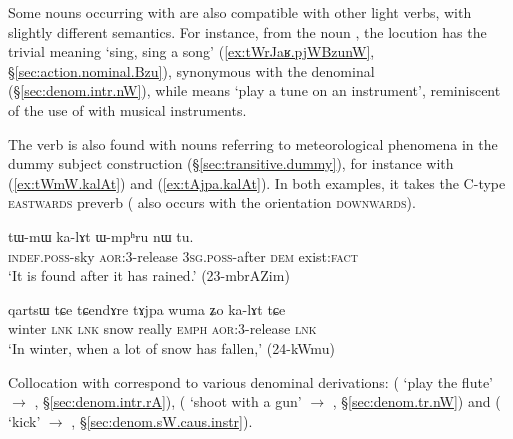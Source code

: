 Some nouns occurring with  are also compatible with other light verbs, with slightly different semantics. For instance, from the noun , the locution  has the trivial meaning `sing, sing a song' (\ref{ex:tWrJaʁ.pjWBzunW}, §\ref{sec:action.nominal.Bzu}), synonymous with the denominal   (§\ref{sec:denom.intr.nW}), while  means `play a tune on an instrument', reminiscent of the use of   with musical instruments.
  
 
 The verb   is also found with nouns referring to meteorological phenomena in the dummy subject construction (§\ref{sec:transitive.dummy}), for instance with   (\ref{ex:tWmW.kalAt})  and   (\ref{ex:tAjpa.kalAt}). In both examples, it takes the C-type  \textsc{eastwards} preverb   ( also occurs with the orientation \textsc{downwards}).

\begin{exe}
\ex \label{ex:tWmW.kalAt}
\gll  tɯ-mɯ ka-lɤt ɯ-mpʰru nɯ tu. \\
\textsc{indef}.\textsc{poss}-sky \textsc{aor}:3\flobv{}-release \textsc{3sg}.\textsc{poss}-after \textsc{dem} exist:\textsc{fact} \\
\glt `It is found after it has rained.' (23-mbrAZim)
\end{exe}

\begin{exe}
\ex \label{ex:tAjpa.kalAt}
\gll qartsɯ tɕe tɕendɤre tɤjpa wuma ʑo ka-lɤt tɕe \\
winter \textsc{lnk} \textsc{lnk} snow really \textsc{emph} \textsc{aor}:3\flobv{}-release \textsc{lnk} \\
\glt `In winter, when a lot of snow has fallen,' (24-kWmu)
\end{exe}

Collocation with  correspond to various denominal derivations:  ( `play the flute' $\rightarrow$ , §\ref{sec:denom.intr.rA}),  ( `shoot with a gun' $\rightarrow$ , §\ref{sec:denom.tr.nW}) and  ( `kick'  $\rightarrow$ , §\ref{sec:denom.sW.caus.instr}).

